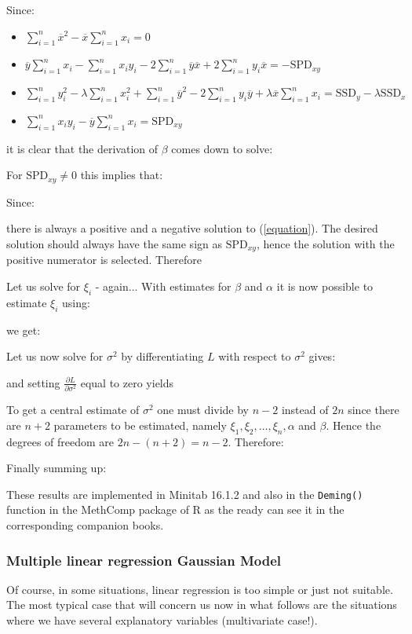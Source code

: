 	Since:
	\begin{itemize}
		\item
		$\displaystyle\sum_{i=1}^n\overline{x}^2
		-\overline{x}\displaystyle\sum_{i=1}^nx_i=0$
		\item
		$\overline{y}\displaystyle\sum_{i=1}^nx_i
		-\displaystyle\sum_{i=1}^nx_iy_i
		-2\displaystyle\sum_{i=1}^n\overline{y}\overline{x}
		+2\displaystyle\sum_{i=1}^ny_i\overline{x}=-\text{SPD}_{xy}$
		\item
		$\displaystyle\sum_{i=1}^ny_i^2
		-\lambda\displaystyle\sum_{i=1}^nx_i^2
		+\displaystyle\sum_{i=1}^n\overline{y}^2
		-2\displaystyle\sum_{i=1}^ny_i\overline{y}
		+\lambda\overline{x}\displaystyle\sum_{i=1}^nx_i
		=\text{SSD}_y-\lambda\text{SSD}_x$
		\item
		$\displaystyle\sum_{i=1}^nx_iy_i
		-\overline{y}\displaystyle\sum_{i=1}^nx_i=\text{SPD}_{xy}$
	\end{itemize}
	it is clear that the derivation of $\beta$ comes down to solve:
	
	For $\text{SPD}_{xy}\neq 0$ this implies that:
	
	Since:
	
	there is always a positive and a negative solution to (\ref{equation}). The desired solution should always have the same sign as $\text{SPD}_{xy}$, hence the solution with the positive numerator is selected. Therefore
	

	Let us solve for $\xi_i$ - again... With estimates for $\beta$ and $\alpha$ it is now possible to estimate $\xi_i$ using:
	
	we get:
	

	Let us now solve for $\sigma^2$ by differentiating $L$ with respect to $\sigma^2$ gives:
	
	and setting $\frac{\partial L}{\partial \sigma^2}$ equal to zero yields
	
	To get a central estimate of $\sigma^2$ one must divide by $n-2$
instead of $2n$ since there are $n+2$ parameters to be estimated,
namely $\xi_1,\xi_2,\ldots,\xi_n,\alpha$ and $\beta$. Hence the
degrees of freedom are $2n-(n+2)=n-2$. Therefore:
	
	Finally summing up:
	
	These results are implemented in Minitab 16.1.2 and also in the \texttt{Deming()} function in the MethComp package of R as the ready can see it in the corresponding companion books.

	\subsubsection{Multiple linear regression Gaussian Model}\label{multiple linear regression gaussian model}
	Of course, in some situations, linear regression is too simple or just not suitable. The most typical case that will concern us now in what follows are the situations where we have several explanatory variables (multivariate case!).
	
